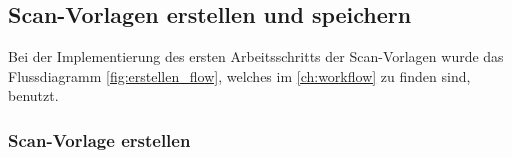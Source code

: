 \documentclass[notables, nomenclature, oneside, 150]{HSMW-Thesis}
\begin{document}
		\subsection{Scan-Vorlagen erstellen und speichern}
			Bei der Implementierung des ersten Arbeitsschritts der Scan-Vorlagen wurde das Flussdiagramm \ref{fig:erstellen_flow}, welches im \autoref{ch:workflow} zu finden sind, benutzt.
			
			\subsubsection*{Scan-Vorlage erstellen}
			\begin{figure}[th]
    			\centering
    			\begin{subfigure}[t]{0.3\textwidth}

\end{subfigure}
\end{figure}
\end{document}
